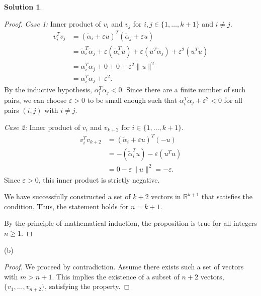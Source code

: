\documentclass[12pt]{article}
\theoremstyle{definition}
\newtheorem*{solution}{\normalfont\textbf{Solution}}
\begin{document}
\begin{enumerate}[leftmargin=*]
\begin{solution}
\begin{proof}
                \textit{Case 1:} Inner product of \(v_i\) and \(v_j\) for \(i, j \in \{1, \ldots, k+1\}\) and \(i \neq j\).
                \begin{align*}
                    v_i^T v_j &= (\tilde{\alpha}_i + \varepsilon u)^T (\tilde{\alpha}_j + \varepsilon u) \\
                    &= \tilde{\alpha}_i^T \tilde{\alpha}_j + \varepsilon(\tilde{\alpha}_i^T u) + \varepsilon(u^T \tilde{\alpha}_j) + \varepsilon^2(u^T u) \\
                    &= \alpha_i^T \alpha_j + 0 + 0 + \varepsilon^2 \|u\|^2 \\
                    &= \alpha_i^T \alpha_j + \varepsilon^2.
                \end{align*}
                By the inductive hypothesis, \( \alpha_i^T \alpha_j < 0 \). Since there are a finite number of such pairs, we can choose \( \varepsilon > 0 \) to be small enough such that \( \alpha_i^T \alpha_j + \varepsilon^2 < 0 \) for all pairs \( (i, j) \) with \( i \neq j \).

                \textit{Case 2:} Inner product of \(v_i\) and \(v_{k+2}\) for \(i \in \{1, \ldots, k+1\}\).
                \begin{align*}
                    v_i^T v_{k+2} &= (\tilde{\alpha}_i + \varepsilon u)^T (-u) \\
                    &= -(\tilde{\alpha}_i^T u) - \varepsilon (u^T u) \\
                    &= 0 - \varepsilon \|u\|^2 = -\varepsilon.
                \end{align*}
                Since \( \varepsilon > 0 \), this inner product is strictly negative.

                We have successfully constructed a set of \(k+2\) vectors in \( \mathbb{R}^{k+1} \) that satisfies the condition. Thus, the statement holds for \(n = k+1\).

                By the principle of mathematical induction, the proposition is true for all integers \( n \geq 1 \).
            \end{proof}
        \item[(b)]
            \begin{proof}
                We proceed by contradiction. Assume there exists such a set of vectors with \( m > n+1 \). This implies the existence of a subset of \( n+2 \) vectors, \( \{v_1, \ldots, v_{n+2}\} \), satisfying the property.


\end{proof}
\end{solution}
\end{enumerate}
\end{document}
